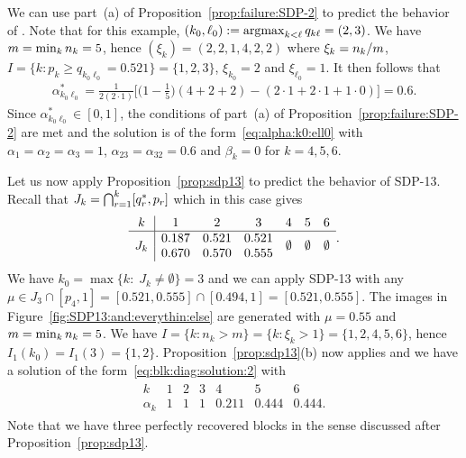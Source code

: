  We can use part~(a) of Proposition~\ref{prop:failure:SDP-2} to predict the behavior of . Note that for this example, $(k_0,\ell_0) := \operatorname*{argmax}_{k < \ell} q_{k \ell} = (2,3)$. We have $m = \min_k n_k = 5$, hence $(\xi_k)=(2,2,1,4,2,2)$ where $\xi_k = n_k /m$, $I = \{k: p_k \ge q_{k_0\ell_0} = 0.521\} = \{1,2,3\}$, $\xi_{k_0} = 2$ and $\xi_{\ell_0} = 1$. It then follows that
\begin{align*}
    \alpha^*_{k_0 \ell_0} = \frac{1}{2 (2 \cdot 1)} \Big[ \Big(1-\frac15\Big)(4+2+2) - (2\cdot1 + 2\cdot1 + 1\cdot 0)\Big] = 0.6.
\end{align*}
Since $\alpha^*_{k_0 \ell_0} \in [0,1]$, the conditions of part~(a) of Proposition~\ref{prop:failure:SDP-2} are met and the solution is of the form~\eqref{eq:alpha:k0:ell0} with $\alpha_1=\alpha_2=\alpha_3 = 1$, $\alpha_{23} = \alpha_{32} = 0.6$ and $\beta_k = 0$ for $ k=4,5,6$.

Let us now apply Proposition~\ref{prop:sdp13} to predict the behavior of SDP-13. Recall that $J_k = \bigcap_{r=1}^k [q^*_r,p_r]$ which in this case gives 
\begin{align*}
  \begin{array}{c|cccccc}
      k & 1 & 2 & 3 & 4 & 5 & 6 \\
      \hline
      \multirow{2}{*}{$J_k$} & 0.187 & 0.521 & 0.521 & 
        \multirow{2}{*}{$\emptyset$} & \multirow{2}{*}{$\emptyset$} & \multirow{2}{*}{$\emptyset$} \\
          & 0.670 & 0.570 & 0.555 & 
  \end{array}.
\end{align*}
We have $k_0 = \max\{k: \; J_k \neq \emptyset\} = 3$ and we can apply SDP-13 with any $\mu \in J_3 \cap [p_4,1] = [0.521,0.555] \cap [0.494,1] = [0.521,0.555]$. The images in Figure~\ref{fig:SDP13:and:everythin:else} are generated with $\mu = 0.55$ and $m = \min_k n_k = 5$. We have $I = \{ k : n_k > m\} = \{k: \xi_k > 1\} = \{ 1,2,4,5,6\}$, hence $I_1(k_0) = I_1(3)=\{1,2\}$. Proposition~\ref{prop:sdp13}(b) now applies and we have a solution of the form~\eqref{eq:blk:diag:solution:2} with
\begin{align*}
  \begin{array}{c|cccccc}
      k & 1 & 2 & 3 & 4 & 5 & 6 \\
      \hline
      \alpha_k & 1 & 1 & 1 & 0.211 & 0.444 & 0.444.
  \end{array}
\end{align*}
Note that we have three perfectly recovered blocks in the sense discussed after Proposition~\ref{prop:sdp13}. 

